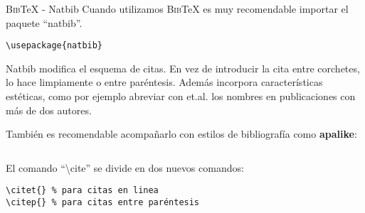 \documentclass[11pt]{beamer}
\newcommand{\BibTeX}{\textsc{Bib}\TeX{}}
\begin{document}
\begin{frame}[fragile]{\BibTeX{} - Natbib}
Cuando utilizamos \BibTeX{} es muy recomendable importar el paquete ``natbib''.
{\color{new_green} \scriptsize
\begin{verbatim}
\usepackage{natbib}
\end{verbatim}
}

Natbib modifica el esquema de citas. En vez de introducir la cita entre corchetes, lo hace limpiamente o entre paréntesis. Además incorpora características estéticas, como por ejemplo abreviar con et.al. los nombres en publicaciones con más de dos autores.

También es recomendable acompañarlo con estilos de bibliografía como \textbf{apalike}:
{\color{new_green} \scriptsize
\begin{verbatim}

\end{verbatim}
}

El comando ``\textbackslash cite{}'' se divide en dos nuevos comandos:
{\color{new_green} \scriptsize
\begin{verbatim}
\citet{} % para citas en linea
\citep{} % para citas entre paréntesis
\end{verbatim}
}

\end{frame}
\end{document}
